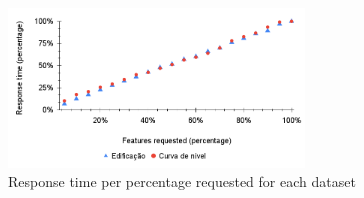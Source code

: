 \begin{figure}[H]
\centering
\includegraphics[width=0.7\textwidth]{img/comparetimeresponsecurvaedificacao.png}
\caption{Response time per percentage requested for each dataset}
\label{fig:timesize}
\end{figure}
